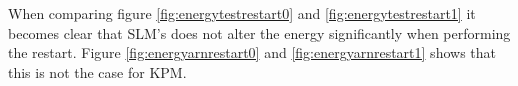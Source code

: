 When comparing figure \ref{fig:energytestrestart0} and \ref{fig:energytestrestart1} it becomes clear that SLM's does not alter the energy significantly when performing the restart. Figure \ref{fig:energyarnrestart0} and \ref{fig:energyarnrestart1} shows that this is not the case for KPM.\\


